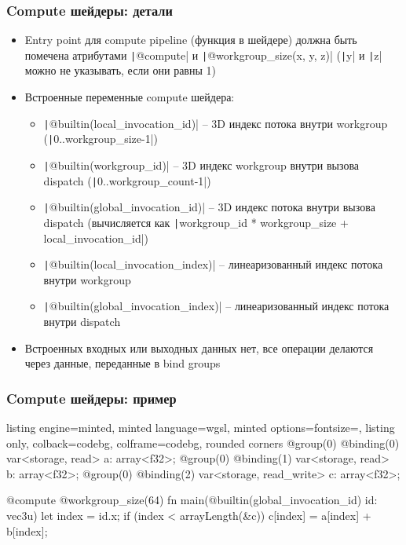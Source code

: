 \documentclass[10pt]{beamer}
\begin{document}
\begin{frame}[fragile]
\frametitle{Compute шейдеры: детали}
\begin{itemize}
\item Entry point для compute pipeline (функция в шейдере) должна быть помечена атрибутами \texttt|@compute| и \texttt|@workgroup_size(x, y, z)| (\texttt|y| и \texttt|z| можно не указывать, если они равны 1)
\pause
\item Встроенные переменные compute шейдера:
\begin{itemize}
\item \texttt|@builtin(local_invocation_id)| -- 3D индекс потока внутри workgroup (\texttt|0..workgroup_size-1|)
\item \texttt|@builtin(workgroup_id)| -- 3D индекс workgroup внутри вызова dispatch (\texttt|0..workgroup_count-1|)
\item \texttt|@builtin(global_invocation_id)| -- 3D индекс потока внутри вызова dispatch (вычисляется как \texttt|workgroup_id * workgroup_size + local_invocation_id|)
\item \texttt|@builtin(local_invocation_index)| -- линеаризованный индекс потока внутри workgroup
\item \texttt|@builtin(global_invocation_index)| -- линеаризованный индекс потока внутри dispatch
\end{itemize}
\pause
\item Встроенных входных или выходных данных нет, все операции делаются через данные, переданные в bind groups
\end{itemize}
\end{frame}

\begin{frame}[fragile]
\frametitle{Compute шейдеры: пример}
\begin{tcblisting}{listing engine=minted, minted language=wgsl, minted options={fontsize=\scriptsize}, listing only, colback=codebg, colframe=codebg, rounded corners}
@group(0) @binding(0) var<storage, read> a: array<f32>;
@group(0) @binding(1) var<storage, read> b: array<f32>;
@group(0) @binding(2) var<storage, read_write> c: array<f32>;

@compute @workgroup_size(64)
fn main(@builtin(global_invocation_id) id: vec3u) {
    let index = id.x;
    if (index < arrayLength(&c)) {
        c[index] = a[index] + b[index];
    }
}
\end{tcblisting}
\end{frame}
\end{document}
